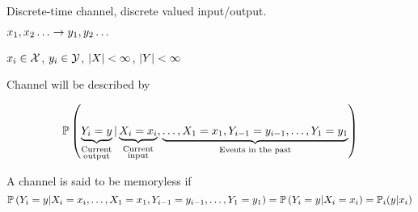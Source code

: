 Discrete-time channel, discrete valued input/output.

$x_1,x_2\ldots \rightarrow y_1, y_2\ldots$

$x_i \in \mathcal{X}$, $y_i \in \mathcal{Y}$, $\left\lvert X\right\rvert < \infty$, $\left\lvert Y\right\rvert < \infty$

Channel will be described by 

\[
    \mathbb{P}\left( \underbrace{Y_i = y}_{\substack{\text{Current}\\\text{output}}} | \underbrace{X_i=x_i}_{\substack{\text{Current}\\\text{input}}}, \underbrace{\ldots, X_1 = x_1,Y_{i-1}=y_{i-1},\ldots, Y_1=y_1}_{\text{Events in the past}} \right)
\]

A channel is said to be memoryless if
\[
    \mathbb{P}\left( Y_i = y | X_i=x_i, \ldots, X_1 = x_1,Y_{i-1}=y_{i-1},\ldots, Y_1=y_1 \right) = \mathbb{P}\left( Y_i = y | X_i=x_i \right) = \mathbb{P}_i(y\vert x_i)
\]



\nocite{*}







